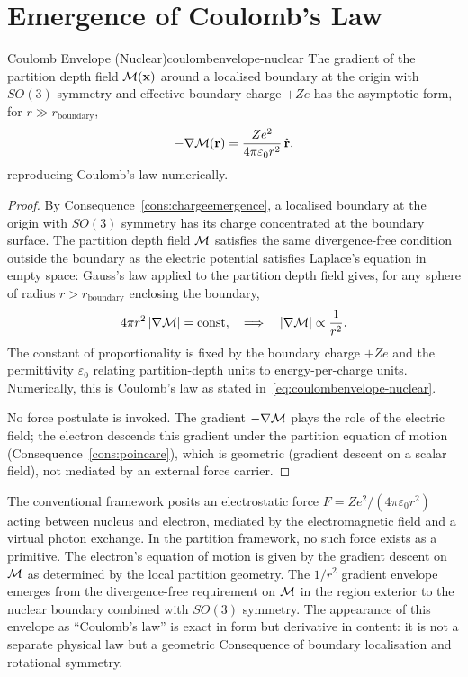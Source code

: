 \section{Emergence of Coulomb's Law}
\label{sec:coulombenvelope-nuclear}

\begin{consequence}{Coulomb Envelope (Nuclear)}{coulombenvelope-nuclear}
The gradient of the partition depth field $\mathcal{M}(\mathbf{x})$ around a
localised boundary at the origin with $SO(3)$ symmetry and effective boundary
charge $+Ze$ has the asymptotic form, for $r\gg r_{\mathrm{boundary}}$,
\begin{equation}
  -\nabla\mathcal{M}(\mathbf{r}) = \frac{Ze^{2}}{4\pi\varepsilon_{0}r^{2}}\,\hat{\mathbf{r}},
  \label{eq:coulombenvelope-nuclear}
\end{equation}
reproducing Coulomb's law numerically.
\end{consequence}

\begin{proof}
By Consequence~\ref{cons:chargeemergence}, a localised boundary at the origin
with $SO(3)$ symmetry has its charge concentrated at the boundary surface.
The partition depth field $\mathcal{M}$ satisfies the same divergence-free condition
outside the boundary as the electric potential satisfies Laplace's equation in
empty space: Gauss's law applied to the partition depth field gives, for any
sphere of radius $r>r_{\mathrm{boundary}}$ enclosing the boundary,
\[
  4\pi r^{2}\,|\nabla\mathcal{M}| = \mathrm{const},
  \quad\Longrightarrow\quad
  |\nabla\mathcal{M}| \propto \frac{1}{r^{2}}.
\]
The constant of proportionality is fixed by the boundary charge $+Ze$ and the
permittivity $\varepsilon_{0}$ relating partition-depth units to energy-per-charge
units.  Numerically, this is Coulomb's law as stated in~\eqref{eq:coulombenvelope-nuclear}.

No force postulate is invoked.  The gradient $-\nabla\mathcal{M}$ plays the role
of the electric field; the electron descends this gradient under the partition
equation of motion (Consequence~\ref{cons:poincare}), which is geometric
(gradient descent on a scalar field), not mediated by an external force
carrier.
\end{proof}

\begin{remark}
The conventional framework posits an electrostatic force
$F=Ze^{2}/(4\pi\varepsilon_{0}r^{2})$ acting between nucleus and electron,
mediated by the electromagnetic field and a virtual photon exchange.  In the
partition framework, no such force exists as a primitive.  The electron's
equation of motion is given by the gradient descent on $\mathcal{M}$ as determined
by the local partition geometry.  The $1/r^{2}$ gradient envelope emerges from
the divergence-free requirement on $\mathcal{M}$ in the region exterior to the
nuclear boundary combined with $SO(3)$ symmetry.  The appearance of this
envelope as ``Coulomb's law'' is exact in form but derivative in content: it
is not a separate physical law but a geometric Consequence of boundary
localisation and rotational symmetry.
\end{remark}

